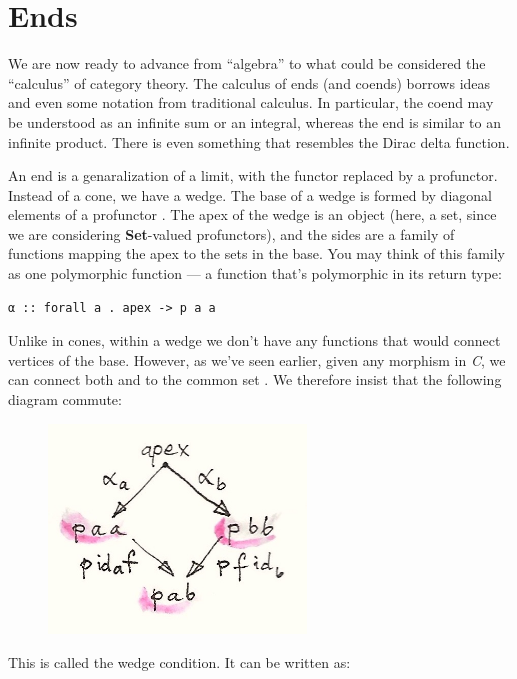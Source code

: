 \section{Ends}\label{ends}

We are now ready to advance from ``algebra'' to what could be considered
the ``calculus'' of category theory. The calculus of ends (and coends)
borrows ideas and even some notation from traditional calculus. In
particular, the coend may be understood as an infinite sum or an
integral, whereas the end is similar to an infinite product. There is
even something that resembles the Dirac delta function.

An end is a genaralization of a limit, with the functor replaced by a
profunctor. Instead of a cone, we have a wedge. The base of a wedge is
formed by diagonal elements of a profunctor . The apex of the
wedge is an object (here, a set, since we are considering
\textbf{Set}-valued profunctors), and the sides are a family of
functions mapping the apex to the sets in the base. You may think of
this family as one polymorphic function --- a function that's
polymorphic in its return type:

\begin{Verbatim}[commandchars=\\\{\}]
α :: forall a . apex -> p a a
\end{Verbatim}
Unlike in cones, within a wedge we don't have any functions that would
connect vertices of the base. However, as we've seen earlier, given any
morphism  in \emph{C}, we can connect both
 and  to the common set
. We therefore insist that the following diagram
commute:

\begin{figure}[H]
\centering
\includegraphics[width=2.69792in]{images/end-2.jpg}
\end{figure}

\noindent
This is called the wedge condition. It can be written as:

